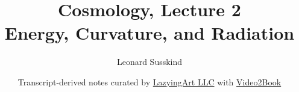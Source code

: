 \documentclass[11pt,oneside]{book}
\begin{document}
\hypersetup{pageanchor=false}
\frontmatter
\title{Cosmology, Lecture 2\\Energy, Curvature, and Radiation}
\author{Leonard Susskind}
\date{Transcript-derived notes curated by \href{https://lazying.art}{LazyingArt LLC} with \href{https://github.com/lachlanchen/Video2Book}{Video2Book}}
\maketitle
\hypersetup{pageanchor=true}
\mainmatter

\end{document}
